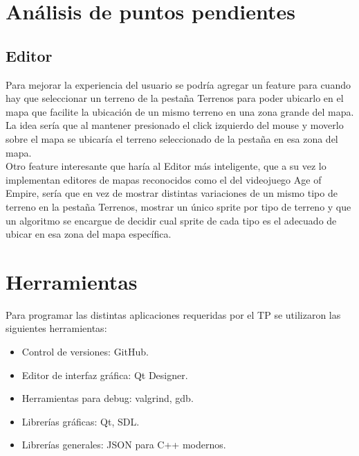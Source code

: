 \documentclass[titlepage,a4paper,12pt]{article}
\begin{document}
\section{Análisis de puntos pendientes}

\subsection{Editor} 

Para mejorar la experiencia del usuario se podría agregar un feature para cuando hay que seleccionar un terreno de la pestaña Terrenos para poder ubicarlo en el mapa que facilite la ubicación de un mismo terreno en una zona grande del mapa. La idea sería que al mantener presionado el click izquierdo del mouse y moverlo sobre el mapa se ubicaría el terreno seleccionado de la pestaña en esa zona del mapa.\\

Otro feature interesante que haría al Editor más inteligente, que a su vez lo implementan editores de mapas reconocidos como el del videojuego Age of Empire, sería que en vez de mostrar distintas variaciones de un mismo tipo de terreno en la pestaña Terrenos, mostrar un único sprite por tipo de terreno y que un algoritmo se encargue de decidir cual sprite de cada tipo es el adecuado de ubicar en esa zona del mapa específica.  

\section{Herramientas}

Para programar las distintas aplicaciones requeridas por el TP se utilizaron las siguientes herramientas: 


\begin{itemize}

\item Control de versiones: GitHub.

\item Editor de interfaz gráfica: Qt Designer.

\item Herramientas para debug: valgrind, gdb.

\item Librerías gráficas: Qt, SDL.

\item Librerías generales: JSON para C++ modernos.

\end{itemize}
\end{document}
